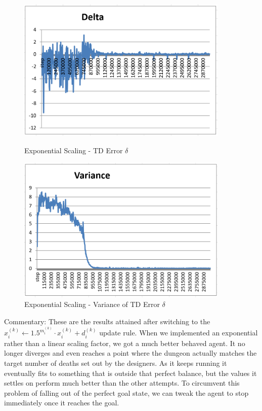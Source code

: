 \documentclass{article}
\begin{document}
\begin{figure}[h]
	\begin{minipage}{0.5 \textwidth}
		\centering
		\includegraphics[width=0.9\textwidth]{Delta.png}
		\caption{Exponential Scaling - TD Error $\delta$}
	\end{minipage}
	\begin{minipage}{0.5 \textwidth}
		\centering
		\includegraphics[width=0.9\textwidth]{Variance.png}
		\caption{Exponential Scaling - Variance of TD Error $\delta$}
	\end{minipage}
\end{figure}

Commentary: These are the results attained after switching to the $x^{(k)}_{i} \leftarrow 1.5^{m^{(k)}_i} \cdot x^{(k)}_{i} + d^{(k)}_i$ update rule. When we implemented an exponential rather than a linear scaling factor, we got a much better behaved agent. It no longer diverges and even reaches a point where the dungeon actually matches the target number of deaths set out by the designers. As it keeps running it eventually fits to something that is outside that perfect balance, but the values it settles on perform much better than the other attempts. To circumvent this problem of falling out of the perfect goal state, we can tweak the agent to stop immediately once it reaches the goal.
\end{document}
